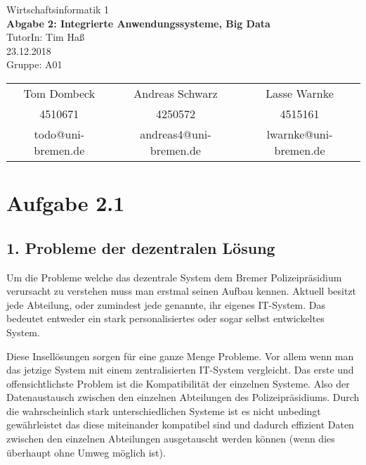 \documentclass[12pt,utf8]{scrartcl}
\makeatletter
\newcommand{\teilnehmerI}{Tom Dombeck}
\newcommand{\mattI}{4510671}
\newcommand{\mailI}{todo@uni-bremen.de}
\newcommand{\teilnehmerII}{Andreas Schwarz}
\newcommand{\mattII}{4250572}
\newcommand{\mailII}{andreas4@uni-bremen.de}
\newcommand{\teilnehmerIII}{Lasse Warnke}
\newcommand{\mattIII}{4515161}
\newcommand{\mailIII}{lwarnke@uni-bremen.de}
\newcommand{\thisgroup}{A01}
\newcommand{\abgabedatum}{23.12.2018}
\newcommand{\nummer}{2}
\newcommand{\thema}{Integrierte Anwendungssysteme, Big Data}
\newcommand{\thistutor}{Tim Haß}
\newcommand{\thiscourse}{Wirtschaftsinformatik 1}
\makeatother
\begin{document}
\begin{titlepage}
	\vspace*{\baselineskip}		
	\centering					
	\LARGE							
	\thiscourse \\ 					
	\vspace{1cm}					
	{\Huge 							
	\textbf{Abgabe \nummer: \thema}} \\ 
	\vspace{1.5cm} 					
	TutorIn: \thistutor \\ 		
	\abgabedatum \\ 				
	\vfill 							
	Gruppe: \thisgroup \\ 			
	\vspace{.5cm} 					
	\large 							
	\begin{tabular}{c|c|c} 		
	\teilnehmerI	& \teilnehmerII & \teilnehmerIII \\ 
	\mattI	& \mattII &  \mattIII\\ 
	\mailI	& \mailII & \mailIII \\ 
	\end{tabular} 
\end{titlepage}

\thispagestyle{empty}
\tableofcontents
\newpage
\setcounter{page}{1}

\section*{Aufgabe 2.1}
\subsection*{\label{sub:thema}1. Probleme der dezentralen Lösung}

Um die Probleme welche das dezentrale System dem Bremer Polizeipräsidium verursacht zu verstehen muss man erstmal seinen Aufbau kennen. Aktuell besitzt jede Abteilung, oder zumindest jede genannte, ihr eigenes IT-System. Das bedeutet entweder ein stark personalisiertes oder sogar selbst entwickeltes System. 

Diese Insellösungen sorgen für eine ganze Menge Probleme. Vor allem wenn man das jetzige System mit einem zentralisierten IT-System vergleicht. 
Das erste und offensichtlichste Problem ist die Kompatibilität der einzelnen Systeme. Also der Datenaustausch zwischen den einzelnen Abteilungen des Polizeipräsidiums. Durch die wahrscheinlich stark unterschiedlichen Systeme ist es nicht unbedingt gewährleistet das diese miteinander kompatibel sind und dadurch effizient Daten zwischen den einzelnen Abteilungen ausgetauscht werden können (wenn dies überhaupt ohne Umweg möglich ist).
\end{document}
